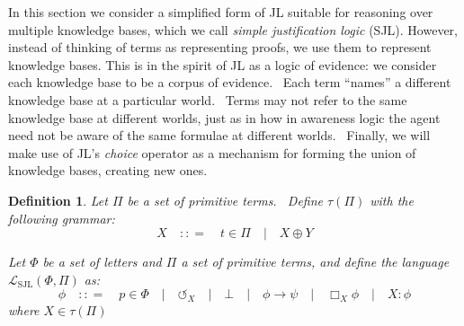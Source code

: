 \documentclass{acmconf}
\newcommand{\tmem}[1]{{\em #1\/}}
\newcommand{\tmop}[1]{\ensuremath{\operatorname{#1}}}
\newcommand{\tmtextit}[1]{{\itshape{#1}}}
\newtheorem{definition}{Definition}
\begin{document}
In this section we consider a simplified form of JL suitable for reasoning
over multiple knowledge bases, which we call \tmtextit{simple justification
logic} (SJL). However, instead of thinking of terms as representing proofs, we
use them to represent knowledge bases. This is in the spirit of JL as a logic
of evidence: we consider each knowledge base to be a corpus of evidence. \
Each term ``names'' a different knowledge base at a particular world. \ Terms
may not refer to the same knowledge base at different worlds, just as in how
in awareness logic the agent need not be aware of the same formulae at
different worlds. \ Finally, we will make use of JL's {\tmem{choice}} operator
as a mechanism for forming the union of knowledge bases, creating new ones.

\begin{definition}
  Let $\Pi$ be a set of primitive terms. \ Define $\tau (\Pi)$ with the
  following grammar:
  \[ X \hspace{1em} : : = \hspace{1em} t \in \Pi \hspace{1em} | \hspace{1em} X
     \oplus Y \]
  
  
  Let $\Phi$ be a set of letters and $\Pi$ a set of primitive terms, and
  define the language $\mathcal{L}_{\tmop{SJL}} (\Phi, \Pi)$ as:
  \[ \phi \hspace{1em} : : = \hspace{1em} p \in \Phi \hspace{1em} |
     \hspace{1em} \circlearrowleft_X \hspace{1em} | \hspace{1em} \bot
     \hspace{1em} | \hspace{1em} \phi \rightarrow \psi \hspace{1em} |
     \hspace{1em} \Box_X \phi \hspace{1em} | \hspace{1em} X : \phi \]
  where $X \in \tau (\Pi)$
\end{definition}
\end{document}
